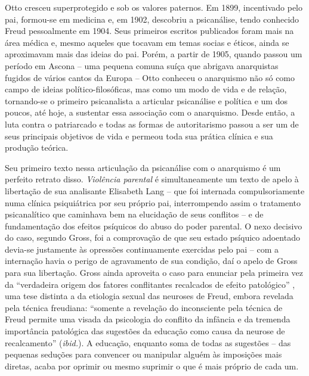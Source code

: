 Otto cresceu superprotegido e sob os valores paternos. Em 1899,
incentivado pelo pai, formou-se em medicina e, em 1902, descobriu a
psicanálise, tendo conhecido Freud pessoalmente em 1904. Seus primeiros
escritos publicados foram mais na área médica e, mesmo aqueles que
tocavam em temas socias e éticos, ainda se aproximavam mais das ideias
do pai. Porém, a partir de 1905, quando passou um período em Ascona --
uma pequena comuna suíça que abrigava anarquistas fugidos de vários
cantos da Europa -- Otto conheceu o anarquismo não só como campo de
ideias político-filosóficas, mas como um modo de vida e de relação,
tornando-se o primeiro psicanalista a articular psicanálise e política e
um dos poucos, até hoje, a sustentar essa associação com o anarquismo.
Desde então, a luta contra o patriarcado e todas as formas de
autoritarismo passou a ser um de seus principais objetivos de vida e
permeou toda sua prática clínica e sua produção teórica.

Seu primeiro texto nessa articulação da psicanálise com o anarquismo é
um perfeito retrato disso. \emph{Violência parental} é simultaneamente
um texto de apelo à libertação de sua analisante Elisabeth Lang -- que
foi internada compulsoriamente numa clínica psiquiátrica por seu próprio
pai, interrompendo assim o tratamento psicanalítico que caminhava bem na
elucidação de seus conflitos -- e de fundamentação dos efeitos psíquicos
do abuso do poder parental. O nexo decisivo do caso, segundo Gross, foi
a comprovação de que seu estado psíquico adoentado devia-se justamente
às opressões continuamente exercidas pelo pai -- com a internação havia
o perigo de agravamento de sua condição, daí o apelo de Gross para sua
libertação. Gross ainda aproveita o caso para enunciar pela primeira vez
da ``verdadeira origem dos fatores conflitantes recalcados de efeito
patológico'' , uma tese distinta a da etiologia sexual das neuroses de
Freud, embora revelada pela técnica freudiana: ``somente a revelação do
inconsciente pela técnica de Freud permite uma visada da psicologia do
conflito da infância e da tremenda importância patológica das sugestões
da educação como causa da neurose de recalcamento'' (\emph{ibid.}). A
educação, enquanto soma de todas as sugestões -- das pequenas seduções
para convencer ou manipular alguém às imposições mais diretas, acaba por
oprimir ou mesmo suprimir o que é mais próprio de cada um.

